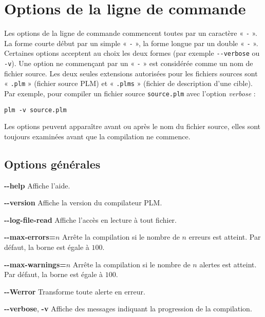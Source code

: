




\chapter{Options de la ligne de commande}

Les options de la ligne de commande commencent toutes par un caractère « \texttt{-} ». La forme courte début par un simple « \texttt{-} », la forme longue par un double « \texttt{-} ». Certaines options acceptent au choix les deux formes (par exemple \texttt{-{}-verbose} ou \texttt{-v}). Une option ne commençant par un « \texttt{-} » est considérée comme un nom de fichier source. Les deux seules extensions autorisées pour les fichiers sources sont « \texttt{.plm} » (fichier source PLM) et  « \texttt{.plms} » (fichier de description d'une cible). Par exemple, pour compiler un fichier source \texttt{source.plm} avec l'option \emph{verbose} :

\texttt{plm -v source.plm}

Les options peuvent apparaître avant ou après le nom du fichier source, elles sont toujours examinées avant que la compilation ne commence.


\section{Options générales}

{\ttfamily\bfseries-{}-help} Affiche l'aide.


{\ttfamily\bfseries-{}-version} Affiche la version du compilateur PLM.



{\ttfamily\bfseries-{}-log-file-read} Affiche l'accès en lecture à tout fichier.

{\ttfamily\bfseries-{}-max-errors=$n$} Arrête la compilation si le nombre de $n$ erreurs est atteint. Par défaut, la borne est égale à $100$.

{\ttfamily\bfseries-{}-max-warnings=$n$} Arrête la compilation si le nombre de $n$ alertes est atteint. Par défaut, la borne est égale à $100$.

{\ttfamily\bfseries-{}-Werror} Transforme toute alerte en erreur.

{\ttfamily\bfseries-{}-verbose}, {\ttfamily\bfseries-v} Affiche des messages indiquant la progression de la compilation.








